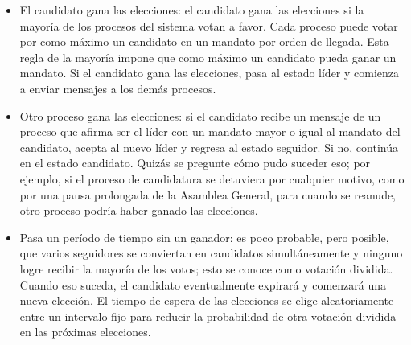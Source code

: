 {\begin{itemize}
	\item El candidato gana las elecciones: el candidato gana las elecciones si la mayoría de los procesos del sistema votan a favor. Cada proceso puede votar por como máximo un candidato en un mandato por orden de llegada. Esta regla de la mayoría impone que como máximo un candidato pueda ganar un mandato. Si el candidato gana las elecciones, pasa al estado líder y comienza a enviar mensajes a los demás procesos.
	\item Otro proceso gana las elecciones: si el candidato recibe un mensaje de un proceso que afirma ser el líder con un mandato mayor o igual al mandato del candidato, acepta al nuevo líder y regresa al estado seguidor. Si no, continúa en el estado candidato. Quizás se pregunte cómo pudo suceder eso; por ejemplo, si el proceso de candidatura se detuviera por cualquier motivo, como por una pausa prolongada de la Asamblea General, para cuando se reanude, otro proceso podría haber ganado las elecciones.
	\item Pasa un período de tiempo sin un ganador: es poco probable, pero posible, que varios seguidores se conviertan en candidatos simultáneamente y ninguno logre recibir la mayoría de los votos; esto se conoce como votación dividida. Cuando eso suceda, el candidato eventualmente expirará y comenzará una nueva elección. El tiempo de espera de las elecciones se elige aleatoriamente entre un intervalo fijo para reducir la probabilidad de otra votación dividida en las próximas elecciones.

\end{itemize}

 




}
